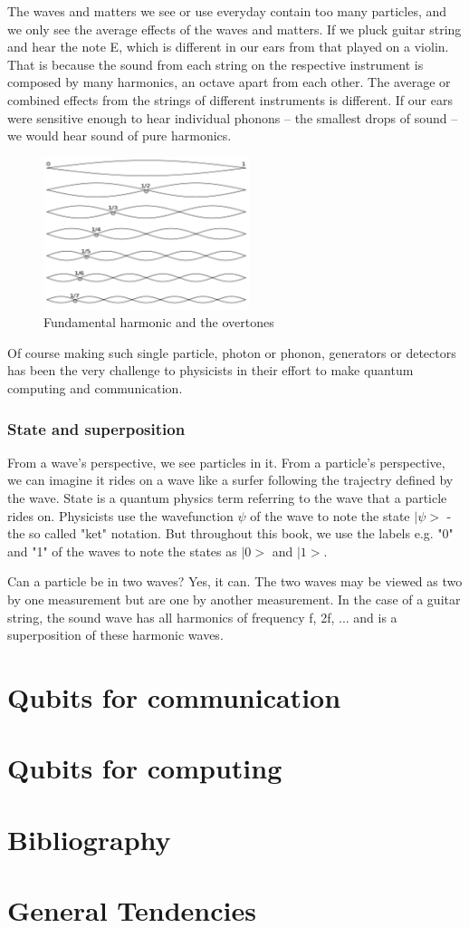 \documentclass{book}
\begin{document}
The waves and matters we see or use everyday contain too many particles, and we only see the average effects of the waves and matters. If we pluck guitar string and hear the note E, which is different in our ears from that played on a violin. That is because the sound from each string on the respective instrument is composed by many harmonics, an octave apart from each other. The average or combined effects from the strings of different instruments is different. If our ears were sensitive enough to hear individual phonons -- the smallest drops of sound -- we would hear sound of pure harmonics.
\begin{figure}[ht]
\includegraphics[width=6cm]{overtones.png}
\caption{Fundamental harmonic and the overtones}
\label{Overtones}
\end{figure}
Of course making such single particle, photon or phonon, generators or detectors has been the very challenge to physicists in their effort to make quantum computing and communication.


\subsection{State and superposition}
From a wave's perspective, we see particles in it. From a particle's perspective, we can imagine it rides on a wave like a surfer following the trajectry defined by the wave. State is a quantum physics term referring to the wave that a particle rides on. Physicists use the wavefunction $\psi$ of the wave to note the state $|\psi>$ - the so called "ket" notation. But throughout this book, we use the labels e.g. "0" and "1" of the waves to note the states as $|0>$ and $|1>$. 

Can a particle be in two waves? Yes, it can. The two waves may be viewed as two by one measurement but are one by another measurement. In the case of a guitar string, the sound wave has all harmonics of frequency f, 2f, ... and is a superposition of these harmonic waves.

\chapter{Qubits for communication}
\chapter{Qubits for computing}
\chapter{Bibliography}
\chapter{General Tendencies}

\backmatter
{}
\printindex
\end{document}
